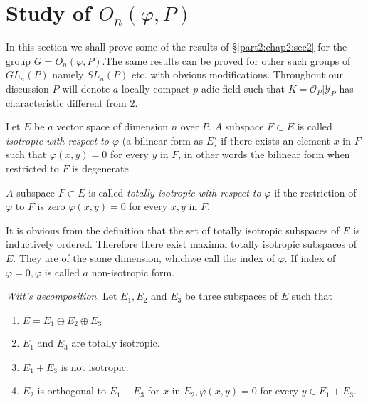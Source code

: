 \section{Study of $O_n (\varphi, P)$}\label{part2:chap2:sec3}

In this section we shall prove some of the results of
\S \ref{part2:chap2:sec2} for the
group $G = O_n(\varphi, P)$.The same results can be proved for other
such groups of $G L_n(P)$ namely $S L_n(P)$ etc. with obvious
modifications. Throughout our discussion $P$ will denote $a$ locally
compact $p$-adic field such that $K= \mathscr{O}_P | \mathscr{Y}_P$ has
characteristic different from $2$. 

\setcounter{definition}{0}
\begin{definition}\label{part2:chap2:sec3:def1}
  Let $E$  be $a$ vector space of dimension $n$ over $P$. $A$ subspace $F
  \subset E$ is called {\em isotropic with respect to $\varphi$} (a
  bilinear form as $E$) if there exists an element $x$ in $F$ such
  that $\varphi (x,y)=0$ for every  $y$ in $F$, in other words the
  bilinear form when restricted to $F$ is degenerate. 
\end{definition}

\begin{definition}\label{part2:chap2:sec3:def2}
  $A$ subspace $F \subset E$ is called  {\em totally isotropic with
    respect to} $\varphi $ if the restriction of $\varphi$ to $F$ is
  zero \iec  $\varphi(x,y)=0 $ for every   $x,y$ in $F$. 
\end{definition}

It is obvious from the definition that the set of totally isotropic
subspaces of $E$ is inductively ordered. Therefore there exist maximal
totally isotropic subspaces of $E$. They are of the same dimension, 
which\pageoriginale we call the index of $\varphi$. If index of
$\varphi=0, \varphi$  is called $a$ non-isotropic form. 

\textit{Witt's decomposition}. Let $E_1, E_2$ and $E_3$  be three
subspaces of $E$ such that 
\begin{enumerate}[(1)]
\item $E=E_1 \oplus  E_2 \oplus  E_3$
\item $E_1$ and $E_3$ are  totally isotropic.
\item $E_1 +E_3$ is not isotropic.
\item $E_2$ is orthogonal to $E_1 +E_3$ \iec for $x$ in $E_2, \varphi
  (x,y)= 0$ for every $y \in E_1 +E_3$. 
\end{enumerate}

